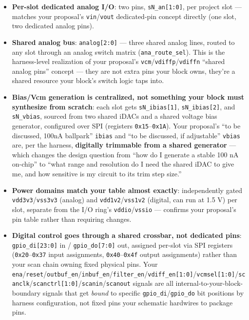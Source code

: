 \documentclass[
]{article}
\providecommand{\tightlist}{%
  \setlength{\itemsep}{0pt}\setlength{\parskip}{0pt}}
\begin{document}
\begin{itemize}
\tightlist
\item
  \textbf{Per-slot dedicated analog I/O}: two pins,
  \texttt{sN\_an{[}1:0{]}}, per project slot --- matches your proposal's
  \texttt{vin}/\texttt{vout} dedicated-pin concept directly (one slot,
  two dedicated analog pins).
\item
  \textbf{Shared analog bus}: \texttt{analog{[}2:0{]}} --- three shared
  analog lines, routed to any slot through an analog switch matrix
  (\texttt{ana\_route\_sel}). This is the harness-level realization of
  your proposal's \texttt{vcm}/\texttt{vdiffp}/\texttt{vdiffn} ``shared
  analog pins'' concept --- they are not extra pins your block owns,
  they're a shared resource your block's switch logic taps into.
\item
  \textbf{Bias/Vcm generation is centralized, not something your block
  must synthesize from scratch}: each slot gets
  \texttt{sN\_ibias{[}1{]}}, \texttt{sN\_ibias{[}2{]}}, and
  \texttt{sN\_vbias}, sourced from two shared iDACs and a shared voltage
  bias generator, configured over SPI (registers
  \texttt{0x15}--\texttt{0x1A}). Your proposal's ``to be discussed,
  100nA ballpark'' \texttt{ibias} and ``to be discussed, if adjustable''
  \texttt{vbias} are, per the harness, \textbf{digitally trimmable from
  a shared generator} --- which changes the design question from ``how
  do I generate a stable 100 nA on-chip'' to ``what range and resolution
  do I need the shared iDAC to give me, and how sensitive is my circuit
  to its trim step size.''
\item
  \textbf{Power domains match your table almost exactly}: independently
  gated \texttt{vdd3v3}/\texttt{vss3v3} (analog) and
  \texttt{vdd1v2}/\texttt{vss1v2} (digital, can run at 1.5 V) per slot,
  separate from the I/O ring's \texttt{vddio}/\texttt{vssio} ---
  confirms your proposal's pin table rather than requiring changes.
\item
  \textbf{Digital control goes through a shared crossbar, not dedicated
  pins}: \texttt{gpio\_di{[}23:0{]}} in / \texttt{gpio\_do{[}7:0{]}}
  out, assigned per-slot via SPI registers (\texttt{0x20}--\texttt{0x37}
  input assignments, \texttt{0x40}--\texttt{0x4f} output assignments)
  rather than your scan chain owning fixed physical pins. Your
  \texttt{ena}/\texttt{reset}/\texttt{outbuf\_en}/\texttt{inbuf\_en}/\texttt{filter\_en}/\texttt{vdiff\_en{[}1:0{]}}/\texttt{vcmsel{[}1:0{]}}/\texttt{scanclk}/\texttt{scanctrl{[}1:0{]}}/\texttt{scanin}/\texttt{scanout}
  signals are all internal-to-your-block-boundary signals that get
  \emph{bound} to specific \texttt{gpio\_di}/\texttt{gpio\_do} bit
  positions by harness configuration, not fixed pins your schematic
  hardwires to package pins.
\end{itemize}
\end{document}
